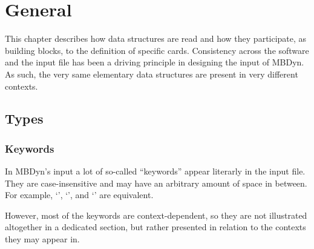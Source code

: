 %
%
%
%
%
% 
%
%

\chapter{General}\label{sec:GENERAL}
This chapter describes how data structures are read 
and how they participate, as building blocks, to the definition
of specific cards.
Consistency across the software and the input file has been 
a driving principle in designing the input of MBDyn.
As such, the very same elementary data structures are present
in very different contexts.



\section{Types}



\subsection{Keywords}
In MBDyn's input a lot of so-called ``keywords'' appear literarly
in the input file.
They are case-insensitive and may have an arbitrary amount of space
in between.
For example, `', `',
and `' are equivalent.

However, most of the keywords are context-dependent,
so they are not illustrated altogether in a dedicated section,
but rather presented in relation to the contexts they may appear in.




